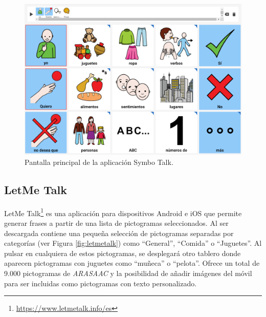\begin{figure}[h!]
	\centering
	\includegraphics[width=0.7\linewidth]{Imagenes/Bitmap/SymboTalk}
	\caption{Pantalla principal de la aplicación Symbo Talk.}
	\label{fig:symbotalk}
\end{figure}

\newpage
\subsection{LetMe Talk}
\label{cap2:sec:letmetalk}
LetMe Talk\footnote{\url{ https://www.letmetalk.info/es}} es una aplicación para dispositivos Android e iOS que permite generar frases a partir de una lista de pictogramas seleccionados. Al ser descargada contiene una pequeña selección de pictogramas separadas por categorías (ver Figura \ref{fig:letmetalk}) como “General”, “Comida” o “Juguetes”. Al pulsar en cualquiera de estos pictogramas, se desplegará otro tablero donde aparecen pictogramas con juguetes como “muñeca” o “pelota”. 
Ofrece un total de 9.000 pictogramas de \textit{ARASAAC} y la posibilidad de añadir imágenes del móvil para ser incluidas como pictogramas con texto personalizado. 


